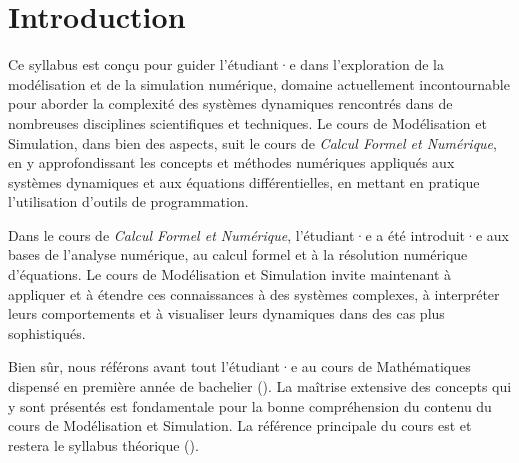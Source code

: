 \chapter{Introduction}
    Ce syllabus est conçu pour guider l'étudiant·e dans l’exploration de la modélisation et de la simulation numérique, domaine actuellement incontournable pour aborder la complexité des systèmes dynamiques rencontrés dans de nombreuses disciplines scientifiques et techniques. Le cours de Modélisation et Simulation, dans bien des aspects, suit le cours de \textit{Calcul Formel et Numérique}, en y approfondissant les concepts et méthodes numériques appliqués aux systèmes dynamiques et aux équations différentielles, en mettant en pratique l'utilisation d’outils de programmation.

    Dans le cours de \textit{Calcul Formel et Numérique}, l'étudiant·e a été introduit·e aux bases de l’analyse numérique, au calcul formel et à la résolution numérique d’équations. Le cours de Modélisation et Simulation invite maintenant à appliquer et à étendre ces connaissances à des systèmes complexes, à interpréter leurs comportements et à visualiser leurs dynamiques dans des cas plus sophistiqués.

    Bien sûr, nous référons avant tout l'étudiant·e au cours de Mathématiques dispensé en première année de bachelier (\cite{mathf117}). La maîtrise extensive des concepts qui y sont présentés est fondamentale pour la bonne compréhension du contenu du cours de Modélisation et Simulation. La référence principale du cours est et restera le syllabus théorique (\cite{infof305}).

